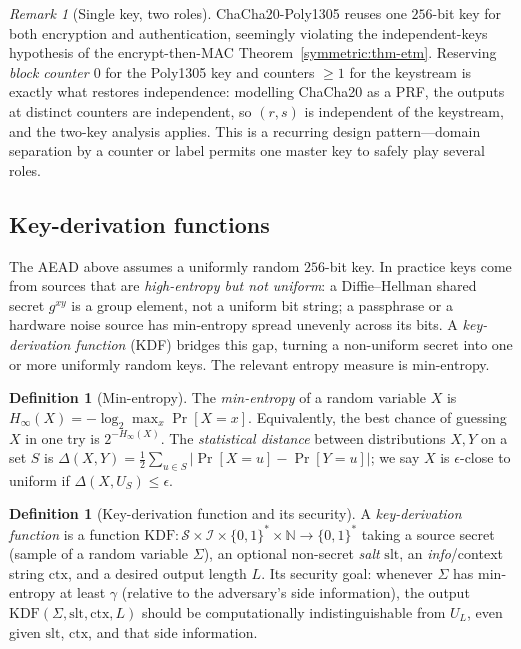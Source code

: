 \documentclass[11pt,a4paper]{article}
\theoremstyle{definition}
\newtheorem{definition}[theorem]{Definition}
\theoremstyle{remark}
\newtheorem{remark}[theorem]{Remark}
\newcommand{\N}{\ensuremath{\mathbb{N}}}
\begin{document}
\begin{remark}[Single key, two roles]\label{symmetric:rem-single-key}
\textsf{ChaCha20-Poly1305} reuses one \(256\)-bit key for both encryption and authentication, seemingly violating the independent-keys hypothesis of the encrypt-then-MAC Theorem~\ref{symmetric:thm-etm}. Reserving \emph{block counter \(0\)} for the \textsf{Poly1305} key and counters \(\ge 1\) for the keystream is exactly what restores independence: modelling \textsf{ChaCha20} as a PRF, the outputs at distinct counters are independent, so \((r,s)\) is independent of the keystream, and the two-key analysis applies. This is a recurring design pattern—domain separation by a counter or label permits one master key to safely play several roles.
\end{remark}

\subsection{Key-derivation functions}\label{symmetric:subsec:kdf}

The AEAD above assumes a uniformly random \(256\)-bit key. In practice keys come from sources that are \emph{high-entropy but not uniform}: a Diffie--Hellman shared secret \(g^{xy}\) is a group element, not a uniform bit string; a passphrase or a hardware noise source has min-entropy spread unevenly across its bits. A \emph{key-derivation function} (KDF) bridges this gap, turning a non-uniform secret into one or more uniformly random keys. The relevant entropy measure is min-entropy.

\begin{definition}[Min-entropy]\label{symmetric:def-minentropy}
The \emph{min-entropy} of a random variable \(X\) is \(H_\infty(X) = -\log_2 \max_x \Pr[X = x]\). Equivalently, the best chance of guessing \(X\) in one try is \(2^{-H_\infty(X)}\). The \emph{statistical distance} between distributions \(X, Y\) on a set \(S\) is \(\Delta(X,Y) = \tfrac12 \sum_{u \in S} |\Pr[X=u] - \Pr[Y=u]|\); we say \(X\) is \(\epsilon\)-close to uniform if \(\Delta(X, U_S) \le \epsilon\).
\end{definition}

\begin{definition}[Key-derivation function and its security]\label{symmetric:def-kdf}
A \emph{key-derivation function} is a function \(\mathrm{KDF} : \mathcal{S} \times \mathcal{I} \times \{0,1\}^\ast \times \N \to \{0,1\}^\ast\) taking a source secret (sample of a random variable \(\Sigma\)), an optional non-secret \emph{salt} \(\mathrm{slt}\), an \emph{info}/context string \(\mathrm{ctx}\), and a desired output length \(L\). Its security goal: whenever \(\Sigma\) has min-entropy at least \(\gamma\) (relative to the adversary's side information), the output \(\mathrm{KDF}(\Sigma, \mathrm{slt}, \mathrm{ctx}, L)\) should be computationally indistinguishable from \(U_L\), even given \(\mathrm{slt}\), \(\mathrm{ctx}\), and that side information.
\end{definition}
\end{document}
